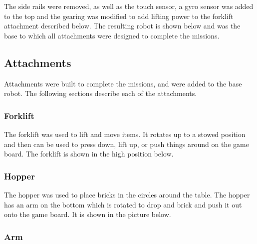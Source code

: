 \documentclass[letter, article]{article}
\begin{document}
\begin{center}
\end{center}

The side rails were removed, as well as the touch sensor, a gyro sensor was added to the top and the gearing was modified to add lifting power to the forklift attachment described below.  The resulting robot is shown below and was the base to which all attachments were designed to complete the missions.

\begin{center}
\end{center}

\subsection{Attachments}

Attachments were built to complete the missions, and were added to the base robot.  The following sections describe each of the attachments.

\subsubsection{Forklift}

The forklift was used to lift and move items.  It rotates up to a stowed position and then can be used to press down, lift up, or push things around on the game board.  The forklift is shown in the high position below.

\begin{center}
\end{center}

\subsubsection{Hopper}

The hopper was used to place bricks in the circles around the table.  The hopper has an arm on the bottom which is rotated to drop and brick and push it out onto the game board.  It is shown in the picture below.

\begin{center}
\end{center}

\subsubsection{Arm}
\end{document}
